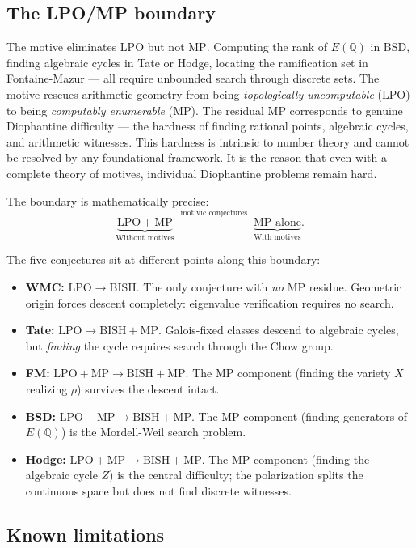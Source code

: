 \documentclass[11pt]{article}
\theoremstyle{definition}
\theoremstyle{remark}
\newcommand{\Q}{\mathbb{Q}}
\newcommand{\LPO}{\mathrm{LPO}}
\newcommand{\MP}{\mathrm{MP}}
\newcommand{\BISH}{\mathrm{BISH}}
\begin{document}
\subsection{The LPO/MP boundary}

The motive eliminates $\LPO$ but not $\MP$. Computing the rank of $E(\Q)$ in BSD, finding algebraic cycles in Tate or Hodge, locating the ramification set in Fontaine-Mazur --- all require unbounded search through discrete sets. The motive rescues arithmetic geometry from being \emph{topologically uncomputable} ($\LPO$) to being \emph{computably enumerable} ($\MP$). The residual $\MP$ corresponds to genuine Diophantine difficulty --- the hardness of finding rational points, algebraic cycles, and arithmetic witnesses. This hardness is intrinsic to number theory and cannot be resolved by any foundational framework. It is the reason that even with a complete theory of motives, individual Diophantine problems remain hard.

The boundary is mathematically precise:
\[
\underbrace{\LPO + \MP}_{\text{Without motives}} \;\xrightarrow{\text{motivic conjectures}}\; \underbrace{\MP \text{ alone}}_{\text{With motives}}.
\]

The five conjectures sit at different points along this boundary:
\begin{itemize}
\item \textbf{WMC:} $\LPO \to \BISH$. The only conjecture with \emph{no} $\MP$ residue. Geometric origin forces descent completely: eigenvalue verification requires no search.
\item \textbf{Tate:} $\LPO \to \BISH + \MP$. Galois-fixed classes descend to algebraic cycles, but \emph{finding} the cycle requires search through the Chow group.
\item \textbf{FM:} $\LPO + \MP \to \BISH + \MP$. The $\MP$ component (finding the variety $X$ realizing $\rho$) survives the descent intact.
\item \textbf{BSD:} $\LPO + \MP \to \BISH + \MP$. The $\MP$ component (finding generators of $E(\Q)$) is the Mordell-Weil search problem.
\item \textbf{Hodge:} $\LPO + \MP \to \BISH + \MP$. The $\MP$ component (finding the algebraic cycle $Z$) is the central difficulty; the polarization splits the continuous space but does not find discrete witnesses.
\end{itemize}

\subsection{Known limitations}
\end{document}
